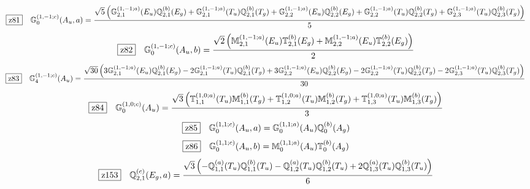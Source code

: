 \documentclass[fleqn,10pt,landscape]{jsarticle}
\begin{document}
\begin{dmath*}
\hspace*{3mm}\fbox{z81}\quad \mathbb{G}_{0}^{(1,-1;c)}(A_{u},a)=\frac{\sqrt{5} \left(\mathbb{G}_{2,1}^{(1,-1;a)}(E_{u}) \mathbb{Q}_{2,1}^{(b)}(E_{g}) + \mathbb{G}_{2,1}^{(1,-1;a)}(T_{u}) \mathbb{Q}_{2,1}^{(b)}(T_{g}) + \mathbb{G}_{2,2}^{(1,-1;a)}(E_{u}) \mathbb{Q}_{2,2}^{(b)}(E_{g}) + \mathbb{G}_{2,2}^{(1,-1;a)}(T_{u}) \mathbb{Q}_{2,2}^{(b)}(T_{g}) + \mathbb{G}_{2,3}^{(1,-1;a)}(T_{u}) \mathbb{Q}_{2,3}^{(b)}(T_{g})\right)}{5}
\end{dmath*}
\begin{dmath*}
\hspace*{3mm}\fbox{z82}\quad \mathbb{G}_{0}^{(1,-1;c)}(A_{u},b)=\frac{\sqrt{2} \left(\mathbb{M}_{2,1}^{(1,-1;a)}(E_{u}) \mathbb{T}_{2,1}^{(b)}(E_{g}) + \mathbb{M}_{2,2}^{(1,-1;a)}(E_{u}) \mathbb{T}_{2,2}^{(b)}(E_{g})\right)}{2}
\end{dmath*}
\begin{dmath*}
\hspace*{3mm}\fbox{z83}\quad \mathbb{G}_{4}^{(1,-1;c)}(A_{u})=\frac{\sqrt{30} \left(3 \mathbb{G}_{2,1}^{(1,-1;a)}(E_{u}) \mathbb{Q}_{2,1}^{(b)}(E_{g}) - 2 \mathbb{G}_{2,1}^{(1,-1;a)}(T_{u}) \mathbb{Q}_{2,1}^{(b)}(T_{g}) + 3 \mathbb{G}_{2,2}^{(1,-1;a)}(E_{u}) \mathbb{Q}_{2,2}^{(b)}(E_{g}) - 2 \mathbb{G}_{2,2}^{(1,-1;a)}(T_{u}) \mathbb{Q}_{2,2}^{(b)}(T_{g}) - 2 \mathbb{G}_{2,3}^{(1,-1;a)}(T_{u}) \mathbb{Q}_{2,3}^{(b)}(T_{g})\right)}{30}
\end{dmath*}
\begin{dmath*}
\hspace*{3mm}\fbox{z84}\quad \mathbb{G}_{0}^{(1,0;c)}(A_{u})=\frac{\sqrt{3} \left(\mathbb{T}_{1,1}^{(1,0;a)}(T_{u}) \mathbb{M}_{1,1}^{(b)}(T_{g}) + \mathbb{T}_{1,2}^{(1,0;a)}(T_{u}) \mathbb{M}_{1,2}^{(b)}(T_{g}) + \mathbb{T}_{1,3}^{(1,0;a)}(T_{u}) \mathbb{M}_{1,3}^{(b)}(T_{g})\right)}{3}
\end{dmath*}
\begin{dmath*}
\hspace*{3mm}\fbox{z85}\quad \mathbb{G}_{0}^{(1,1;c)}(A_{u},a)=\mathbb{G}_{0}^{(1,1;a)}(A_{u}) \mathbb{Q}_{0}^{(b)}(A_{g})
\end{dmath*}
\begin{dmath*}
\hspace*{3mm}\fbox{z86}\quad \mathbb{G}_{0}^{(1,1;c)}(A_{u},b)=\mathbb{M}_{0}^{(1,1;a)}(A_{u}) \mathbb{T}_{0}^{(b)}(A_{g})
\end{dmath*}
\begin{dmath*}
\hspace*{3mm}\fbox{z153}\quad \mathbb{Q}_{2,1}^{(c)}(E_{g},a)=\frac{\sqrt{3} \left(- \mathbb{Q}_{1,1}^{(a)}(T_{u}) \mathbb{Q}_{1,1}^{(b)}(T_{u}) - \mathbb{Q}_{1,2}^{(a)}(T_{u}) \mathbb{Q}_{1,2}^{(b)}(T_{u}) + 2 \mathbb{Q}_{1,3}^{(a)}(T_{u}) \mathbb{Q}_{1,3}^{(b)}(T_{u})\right)}{6}
\end{dmath*}
\end{document}
